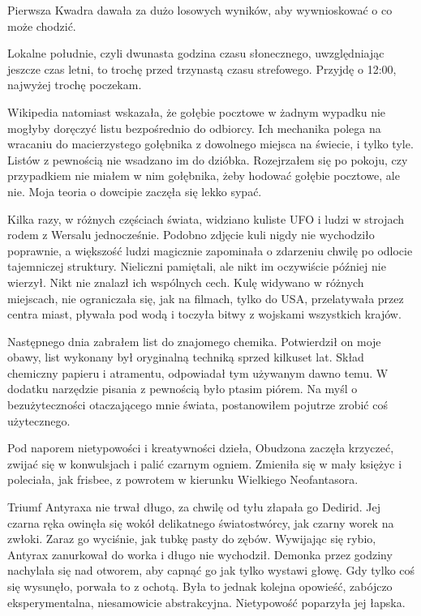 Pierwsza Kwadra dawała za dużo losowych wyników, aby wywnioskować o co może chodzić.

Lokalne południe, czyli dwunasta godzina czasu słonecznego, uwzględniając jeszcze czas letni, to trochę przed trzynastą czasu strefowego.
Przyjdę o 12:00, najwyżej trochę poczekam.

Wikipedia natomiast wskazała, że gołębie pocztowe w żadnym wypadku nie mogłyby doręczyć listu bezpośrednio do odbiorcy.
Ich mechanika polega na wracaniu do macierzystego gołębnika z dowolnego miejsca na świecie, i tylko tyle.
Listów z pewnością nie wsadzano im do dzióbka.
Rozejrzałem się po pokoju, czy przypadkiem nie miałem w nim gołębnika, żeby hodować gołębie pocztowe, ale nie.
Moja teoria o dowcipie zaczęła się lekko sypać.

Kilka razy, w różnych częściach świata, widziano kuliste UFO i ludzi w strojach rodem z Wersalu jednocześnie.
Podobno zdjęcie kuli nigdy nie wychodziło poprawnie, a większość ludzi magicznie zapominała o zdarzeniu chwilę po odlocie tajemniczej struktury.
Nieliczni pamiętali, ale nikt im oczywiście później nie wierzył. Nikt nie znalazł ich wspólnych cech.
Kulę widywano w różnych miejscach, nie ograniczała się, jak na filmach, tylko do USA, przelatywała przez centra miast, pływała pod wodą
i toczyła bitwy z wojskami wszystkich krajów.

Następnego dnia zabrałem list do znajomego chemika.
Potwierdził on moje obawy, list wykonany był oryginalną techniką sprzed kilkuset lat.
Skład chemiczny papieru i atramentu, odpowiadał tym używanym dawno temu.
W dodatku narzędzie pisania z pewnością było ptasim piórem.
Na myśl o bezużyteczności otaczającego mnie świata, postanowiłem pojutrze zrobić coś użytecznego.

\divider{}

Pod naporem nietypowości i kreatywności dzieła, Obudzona zaczęła krzyczeć, zwijać się w konwulsjach i palić czarnym ogniem.
Zmieniła się w mały księżyc i poleciała, jak frisbee, z powrotem w kierunku Wielkiego Neofantasora.

Triumf Antyraxa nie trwał długo, za chwilę od tyłu złapała go Dedirid.
Jej czarna ręka owinęła się wokół delikatnego światostwórcy, jak czarny worek na zwłoki.
Zaraz go wyciśnie, jak tubkę pasty do zębów.
Wywijając się rybio, Antyrax zanurkował do worka i długo nie wychodził.
Demonka przez godziny nachylała się nad otworem, aby capnąć go jak tylko wystawi głowę.
Gdy tylko coś się wysunęło, porwała to z ochotą.
Była to jednak kolejna opowieść, zabójczo eksperymentalna, niesamowicie abstrakcyjna.
Nietypowość poparzyła jej łapska.

